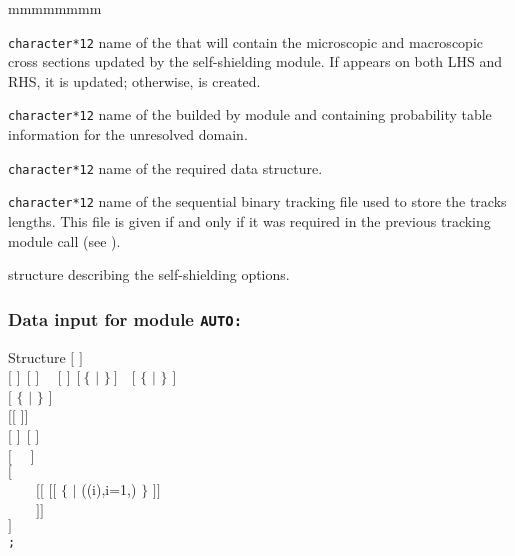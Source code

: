 \begin{ListeDeDescription}{mmmmmmmm}

\item[\dusa{MICLIB}] {\tt character*12} name of the  that will
contain the microscopic and macroscopic cross sections updated by the
self-shielding module. If
 appears on both LHS and RHS, it is updated; otherwise,
 is created.

\item[\dusa{MICLIB\_SG}] {\tt character*12} name of the  builded
by module  and containing probability table information for the unresolved
domain.

\item[\dusa{TRKNAM}] {\tt character*12} name of the required 
data structure.

\item[\dusa{TRKFIL}] {\tt character*12} name of the sequential binary tracking
file used to store the tracks lengths. This file is given if and only if it was
required in the previous tracking module call (see ).

\item[\dstr{descauto}] structure describing the self-shielding options.

\end{ListeDeDescription}

\subsubsection{Data input for module {\tt AUTO:}}\label{sect:descauto}

\begin{DataStructure}{Structure }
$[$   $]$ \\
$[$    $]~~[$    $]$~~
$[$   $]~~[~\{$  $|$  $\}~]$~~$[$ $\{$  $|$  $\}$ $]$ \\ 
$[$ $\{$  $|$  $\}$ $]$ \\
$[[$    $]]$ \\
$[$   $]~~[$   $]$ \\
$[$~ ~$]$ \\
$[$  \\
~~~~$[[$   $[[$  $\{$  $|$
((i),i=1,) $\}$ $]]$ \\
~~~~$]]$ \\
 $]$ \\
{\tt ;}
\end{DataStructure}

